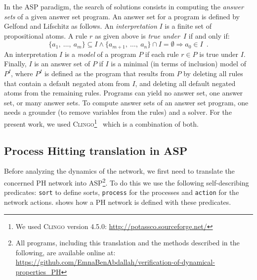 In the ASP paradigm, the search of solutions consists in computing the \emph{answer sets} of a given answer set program.
An answer set for a program is defined by Gelfond and Lifschitz \cite{DBLP:conf/iclp/GelfondL88} as follows.
An \emph{interpretation} $I$ is a finite set of propositional atoms.
A rule $r$ as given above is \emph{true under~$I$} if and only if:
  \[\{a_1,\ \dots,\ a_{m}\} \subseteq I \wedge \{a_{m+1},\ \ldots,\ a_{n}\} \cap I = \emptyset \Rightarrow a_{0} \in I \enspace.\]
An interpretation $I$ is a \emph{model} of a program $P$ if each rule $r \in P$ is true under $I$.
Finally, $I$ is an answer set of $P$ if $I$ is a minimal (in terms of inclusion) model of $P^{I}$,
where $P^{I}$ is defined as the program that results from $P$ by deleting all rules that contain a default negated atom from $I$,
and deleting all default negated atoms from the remaining rules.
Programs can yield no answer set, one answer set, or many answer sets.
To compute answer sets of an answer set program, one needs a grounder (to remove variables from the rules) and a solver.
For the present work, we used \textsc{Clingo}\footnote{We used \textsc{Clingo} version 4.5.0: \url{http://potassco.sourceforge.net/}}~\cite{gebser2008user, gebser2010incremental} which is a combination of both.

\subsection{Process Hitting translation in ASP}
Before analyzing the dynamics of the network,
we first need to translate the concerned PH network into ASP\footnote{All programs, including this translation and the methods described in the following, are available online at: \url{https://github.com/EmnaBenAbdallah/verification-of-dynamical-properties_PH}}.
To do this we use the following self-describing predicates:
\texttt{sort} to define sorts, \texttt{process} for the processes and \texttt{action} for the network actions.
 shows how a PH network is defined with these predicates.

